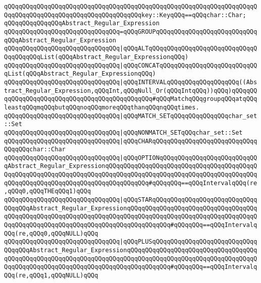 \verb|qQQqqQQqqQQqqQQqqQQqqQQqqQQqqQQqqQQqqQQqqQQqqQQqqQQqqQQqqQQqqQQqqQQqqQQqqQQqqQQqqQQqqQQqqQQqqQQqqQQqqQQqqQQqkey::KeyqQQq==qQQqchar::Char;|\newline
\newline
\verb|qQQqqQQqqQQqqQQqAbstract_Regular_Expression|\newline
\verb|qQQqqQQqqQQqqQQqqQQqqQQqqQQqqQQq=qQQqGROUPqQQqqQQqqQQqqQQqqQQqqQQqqQQqqQQqAbstract_Regular_Expression|\newline
\verb|qQQqqQQqqQQqqQQqqQQqqQQqqQQqqQQq|\verb#|qQQqALTqQQqqQQqqQQqqQQqqQQqqQQqqQQqqQQqqQQqqQQqList(qQQqAbstract_Regular_ExpressionqQQq)#\newline
\verb|qQQqqQQqqQQqqQQqqQQqqQQqqQQqqQQq|\verb#|qQQqCONCATqQQqqQQqqQQqqQQqqQQqqQQqqQQqList(qQQqAbstract_Regular_ExpressionqQQq)#\newline
\verb|qQQqqQQqqQQqqQQqqQQqqQQqqQQqqQQq|\verb#|qQQqINTERVALqQQqqQQqqQQqqQQqqQQq((Abstract_Regular_Expression,qQQqInt,qQQqNull_Or(qQQqIntqQQq))qQQq)qQQqqQQqqQQqqQQqqQQqqQQqqQQqqQQqqQQqqQQqqQQqqQQq#\verb|#qQQqMatchqQQqgroupqQQqatqQQqleastqQQqmqQQqbutqQQqnoqQQqmoreqQQqthanqQQqnqQQqtimes.|\newline
\verb|qQQqqQQqqQQqqQQqqQQqqQQqqQQqqQQq|\verb#|qQQqMATCH_SETqQQqqQQqqQQqqQQqchar_set::Set#\newline
\verb|qQQqqQQqqQQqqQQqqQQqqQQqqQQqqQQq|\verb#|qQQqNONMATCH_SETqQQqchar_set::Set#\newline
\verb|qQQqqQQqqQQqqQQqqQQqqQQqqQQqqQQq|\verb#|qQQqCHARqQQqqQQqqQQqqQQqqQQqqQQqqQQqqQQqqQQqchar::Char#\newline
\verb|qQQqqQQqqQQqqQQqqQQqqQQqqQQqqQQq|\verb#|qQQqOPTIONqQQqqQQqqQQqqQQqqQQqqQQqqQQqAbstract_Regular_ExpressionqQQqqQQqqQQqqQQqqQQqqQQqqQQqqQQqqQQqqQQqqQQqqQQqqQQqqQQqqQQqqQQqqQQqqQQqqQQqqQQqqQQqqQQqqQQqqQQqqQQqqQQqqQQqqQQqqQQqqQQqqQQqqQQqqQQqqQQqqQQqqQQqqQQqqQQq#\verb|#qQQqqQQq==qQQqIntervalqQQq(re,qQQq0,qQQqTHEqQQq1)qQQq|\newline
\verb|qQQqqQQqqQQqqQQqqQQqqQQqqQQqqQQq|\verb#|qQQqSTARqQQqqQQqqQQqqQQqqQQqqQQqqQQqqQQqqQQqAbstract_Regular_ExpressionqQQqqQQqqQQqqQQqqQQqqQQqqQQqqQQqqQQqqQQqqQQqqQQqqQQqqQQqqQQqqQQqqQQqqQQqqQQqqQQqqQQqqQQqqQQqqQQqqQQqqQQqqQQqqQQqqQQqqQQqqQQqqQQqqQQqqQQqqQQqqQQqqQQqqQQq#\verb|#qQQqqQQq==qQQqIntervalqQQq(re,qQQq0,qQQqNULL)qQQq|\newline
\verb|qQQqqQQqqQQqqQQqqQQqqQQqqQQqqQQq|\verb#|qQQqPLUSqQQqqQQqqQQqqQQqqQQqqQQqqQQqqQQqqQQqAbstract_Regular_ExpressionqQQqqQQqqQQqqQQqqQQqqQQqqQQqqQQqqQQqqQQqqQQqqQQqqQQqqQQqqQQqqQQqqQQqqQQqqQQqqQQqqQQqqQQqqQQqqQQqqQQqqQQqqQQqqQQqqQQqqQQqqQQqqQQqqQQqqQQqqQQqqQQqqQQqqQQq#\verb|#qQQqqQQq==qQQqIntervalqQQq(re,qQQq1,qQQqNULL)qQQq|\newline

